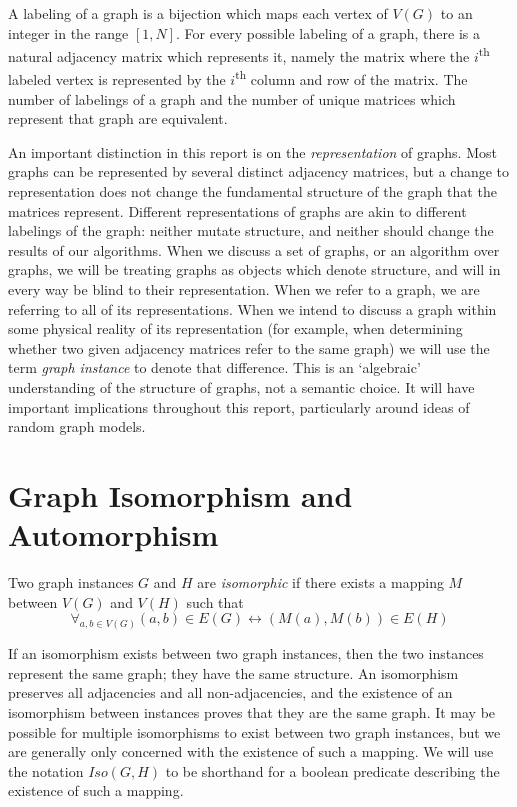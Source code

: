 \documentclass[11pt,a4paper]{report}
\newcommand{\ts}{\textsuperscript}
\begin{document}
A labeling of a graph is a bijection which maps each vertex of $V(G)$ to an integer in the range $[1, N]$.
For every possible labeling of a graph, there is a natural adjacency matrix which represents it, namely the matrix where the $i$\ts{th} labeled vertex is represented by the $i$\ts{th} column and row of the matrix.
The number of labelings of a graph and the number of unique matrices which represent that graph are equivalent.

An important distinction in this report is on the \emph{representation} of graphs.
Most graphs can be represented by several distinct adjacency matrices, but a change to representation does not change the fundamental structure of the graph that the matrices represent.
Different representations of graphs are akin to different labelings of the graph: neither mutate structure, and neither should change the results of our algorithms.
When we discuss a set of graphs, or an algorithm over graphs, we will be treating graphs as objects which denote structure, and will in every way be blind to their representation.
When we refer to a graph, we are referring to all of its representations.
When we intend to discuss a graph within some physical reality of its representation (for example, when determining whether two given adjacency matrices refer to the same graph) we will use the term \emph{graph instance} to denote that difference.
This is an `algebraic' understanding of the structure of graphs, not a semantic choice. 
It will have important implications throughout this report, particularly around ideas of random graph models.

\section{Graph Isomorphism and Automorphism}
Two graph instances $G$ and $H$ are \emph{isomorphic} if there exists a mapping $M$ between $V(G)$ and $V(H)$ such that $$\forall_{a, b \in V(G)} (a, b) \in E(G) \leftrightarrow (M(a), M(b)) \in E(H)$$

If an isomorphism exists between two graph instances, then the two instances represent the same graph; they have the same structure.
An isomorphism preserves all adjacencies and all non-adjacencies, and the existence of an isomorphism between instances proves that they are the same graph.
It may be possible for multiple isomorphisms to exist between two graph instances, but we are generally only concerned with the existence of such a mapping.
We will use the notation $Iso(G, H)$ to be shorthand for a boolean predicate describing the existence of such a mapping.
\end{document}
